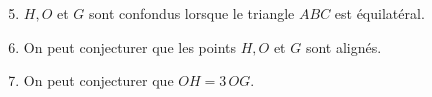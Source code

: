
\begin{corrige}
    \begin{enumerate}
        \setcounter{enumi}{4}
        \item $H, O$ et $G$ sont confondus lorsque {\red le triangle $ABC$ est équilatéral}.
        \item On peut conjecturer que {\red les points $H, O$ et $G$ sont alignés}.
        \item On peut conjecturer que {\red $OH =3\,OG$}.
    \end{enumerate}
\end{corrige}
